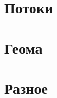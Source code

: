 \documentclass[a4paper,twocolumn,8pt]{extarticle}
\begin{document}
    \section{Потоки}
    
    

    

    \section{Геома}
    
    \section{Разное}
    

\end{document}
